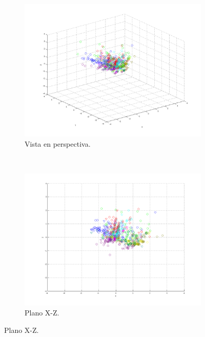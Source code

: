 \documentclass[informe.tex]{subfiles}
\begin{document}
      
	\begin{figure}[H]
        \centering
        \hspace*{-6.5cm}
        \begin{subfigure}[b]{0.49\textwidth}
                \includegraphics[width=\textwidth]{graficos/fold1_criterioParadao_reglas_alpha0_rep1_0P.png}
                \caption{Vista en perspectiva.}
        \end{subfigure}%
        ~
        \begin{subfigure}[b]{0.49\textwidth}
                \includegraphics[width=\textwidth]{graficos/fold1_criterioParadao_reglas_alpha0_rep1_1XZ.png}
                \caption{Plano X-Z.}
        \end{subfigure}
        

\end{figure}
\end{document}
